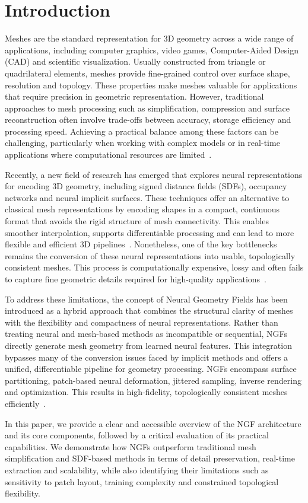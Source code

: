 \section{Introduction}\label{sec:introduction}

Meshes are the standard representation for 3D geometry across a wide range of applications, including computer graphics, video games, Computer-Aided Design (CAD) and scientific visualization.  
Usually constructed from triangle or quadrilateral elements, meshes provide fine-grained control over surface shape, resolution and topology.  
These properties make meshes valuable for applications that require precision in geometric representation.  
However, traditional approaches to mesh processing such as simplification, compression and surface reconstruction often involve trade-offs between accuracy, storage efficiency and processing speed.  
Achieving a practical balance among these factors can be challenging, particularly when working with complex models or in real-time applications where computational resources are limited~\cite{maglo2015}.  

Recently, a new field of research has emerged that explores neural representations for encoding 3D geometry, including signed distance fields (SDFs), occupancy networks and neural implicit surfaces.  
These techniques offer an alternative to classical mesh representations by encoding shapes in a compact, continuous format that avoids the rigid structure of mesh connectivity.  
This enables smoother interpolation, supports differentiable processing and can lead to more flexible and efficient 3D pipelines~\cite{park2019}.  
Nonetheless, one of the key bottlenecks remains the conversion of these neural representations into usable, topologically consistent meshes.  
This process is computationally expensive, lossy and often fails to capture fine geometric details required for high-quality applications~\cite{sivaram2024}.  

To address these limitations, the concept of Neural Geometry Fields has been introduced as a hybrid approach that combines the structural clarity of meshes with the flexibility and compactness of neural representations.  
Rather than treating neural and mesh-based methods as incompatible or sequential, NGFs directly generate mesh geometry from learned neural features.  
This integration bypasses many of the conversion issues faced by implicit methods and offers a unified, differentiable pipeline for geometry processing.  
NGFs encompass surface partitioning, patch-based neural deformation, jittered sampling, inverse rendering and optimization.  
This results in high-fidelity, topologically consistent meshes efficiently~\cite{sivaram2024}.  

In this paper, we provide a clear and accessible overview of the NGF architecture and its core components, followed by a critical evaluation of its practical capabilities.  
We demonstrate how NGFs outperform traditional mesh simplification and SDF-based methods in terms of detail preservation, real-time extraction and scalability, while also identifying their limitations such as sensitivity to patch layout, training complexity and constrained topological flexibility.  
